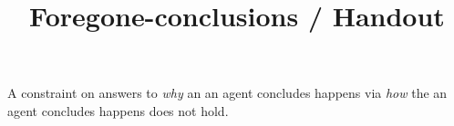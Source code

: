 \documentclass[10pt]{article}
\title{
  Foregone-conclusions \quad / \quad Handout
}
\date{ }
\begin{document}
\maketitle

\begin{comment}
  \begin{itemize}
  \item
    Goal for this talk is to cover the foundations of the thesis.
    If things go well, at the end of the presentation you will have a fairly good idea of:
    \begin{enumerate}
    \item
      Broadly, what the thesis is about.
    \item
      What I argued for.
    \item
      The `core' of the argument.

      The thesis is very detail oriented.
      However, most of the thesis amounts to refining a particular idea to obtain a specific result.
      The way the idea is refined is beyond the scope of a presentation like this, but I think the idea itself almost fits.
    \end{enumerate}

    I don't really like slides, so I've prepared a handout.
  \item
    Slightly high level:
    \begin{itemize}
    \item
      Given an event in which an agent concludes, two broad questions.
      `Why' and `how'.
      And, may think answers to why are constrained by answers to how.

      A fairly well-known instance of this is \citeauthor{Davidson:1963aa}'s account of rationalisations.
    \item
      Briefly look at an instance.
      Introduce some abstractions, state `why' and `how', and the constraint.
      I argue constraint fails to hold.
    \item
      Core part of the argument is a way to obtain answers to why.
    \end{itemize}
  \end{itemize}
\end{comment}


\begin{thesis}
  A constraint on answers to \emph{why} an  an agent concludes happens via \emph{how} the  an agent concludes happens does not hold.
\end{thesis}
\end{document}
